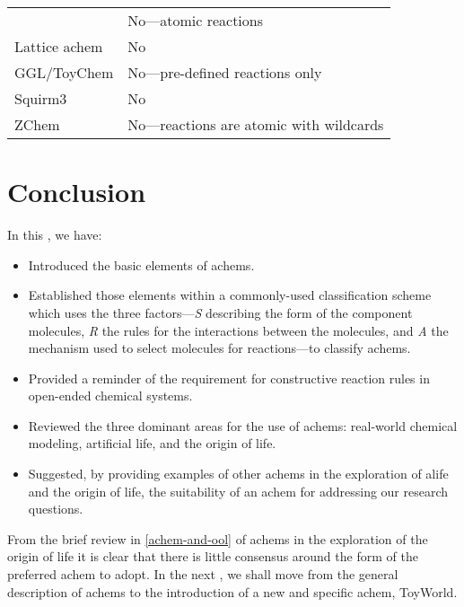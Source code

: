 \begin{table}
\begin{center}
\begin{tabular}{@{}p{7.5cm}p{6cm}@{}}
		\textcite{Gardiner2007}                                                & No---atomic reactions                    \\
		Lattice \gls{achem} \parencite{Ono2000,Madina2003}        		   & No                                       \\
		GGL/ToyChem \parencite{Benko2003}                                  & No---pre-defined reactions only          \\
		Squirm3 \parencite{Hutton2002,Lucht2012}                           & No                                       \\
		ZChem \parencite{Tominaga2004}                                     & No---reactions are atomic with wildcards \\
		\bottomrule
	\end{tabular}
	\end{center}
\end{table}

\section{Conclusion}

In this , we have:

\begin{itemize}
	\item Introduced the basic elements of \glspl{achem}.
	\item Established those elements within a commonly-used classification scheme \parencite{Dittrich:2001zr} which uses the three factors---\emph{S} describing the form of the component molecules, \emph{R} the rules for the interactions between the molecules, and \emph{A} the mechanism used to select molecules for reactions---to classify \glspl{achem}.
	\item Provided a reminder of the requirement for constructive reaction rules in open-ended chemical systems.
	\item Reviewed the three dominant areas for the use of \glspl{achem}: real-world chemical modeling, artificial life, and the origin of life.
	\item Suggested, by providing examples of other \glspl{achem} in the exploration of \gls{alife} and the origin of life, the suitability of an \gls{achem} for addressing our research questions.
\end{itemize}

From the brief review in \cref{achem-and-ool} of \glspl{achem} in the exploration of the origin of life it is clear that there is little consensus around the form of the preferred \gls{achem} to adopt. In the next , we shall move from the general description of \glspl{achem} to the introduction of a new and specific \gls{achem}, ToyWorld.
